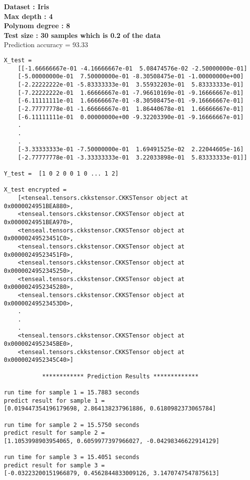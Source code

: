 \documentclass[11pt]{article}
\begin{document}
\textbf{Dataset : Iris}\\
\textbf{Max depth : 4}\\
\textbf{Polynom degree : 8 }\\
\textbf{Test size : 30 samples which is 0.2 of the data}\\
\large {Prediction accuracy = 93.33}\\
\begin{lstlisting}
X_test =  
    [[-1.66666667e-01 -4.16666667e-01  5.08474576e-02 -2.50000000e-01]
    [-5.00000000e-01  7.50000000e-01 -8.30508475e-01 -1.00000000e+00]
    [-2.22222222e-01 -5.83333333e-01  3.55932203e-01  5.83333333e-01]
    [-7.22222222e-01  1.66666667e-01 -7.96610169e-01 -9.16666667e-01]
    [-6.11111111e-01  1.66666667e-01 -8.30508475e-01 -9.16666667e-01]
    [-2.77777778e-01 -1.66666667e-01  1.86440678e-01  1.66666667e-01]
    [-6.11111111e-01  0.00000000e+00 -9.32203390e-01 -9.16666667e-01]
    .
    .
    .
    [-3.33333333e-01 -7.50000000e-01  1.69491525e-02  2.22044605e-16]
    [-2.77777778e-01 -3.33333333e-01  3.22033898e-01  5.83333333e-01]]
 
Y_test =  [1 0 2 0 0 1 0 ... 1 2]

X_test encrypted = 
    [<tenseal.tensors.ckkstensor.CKKSTensor object at 0x0000024951BEA880>, 
    <tenseal.tensors.ckkstensor.CKKSTensor object at 0x0000024951BEA970>, 
    <tenseal.tensors.ckkstensor.CKKSTensor object at 0x00000249523451C0>, 
    <tenseal.tensors.ckkstensor.CKKSTensor object at 0x00000249523451F0>, 
    <tenseal.tensors.ckkstensor.CKKSTensor object at 0x0000024952345250>, 
    <tenseal.tensors.ckkstensor.CKKSTensor object at 0x0000024952345280>, 
    <tenseal.tensors.ckkstensor.CKKSTensor object at 0x00000249523453D0>,
    .
    .
    .
    <tenseal.tensors.ckkstensor.CKKSTensor object at 0x0000024952345BE0>, 
    <tenseal.tensors.ckkstensor.CKKSTensor object at 0x0000024952345C40>]
    
           ************ Prediction Results *************
           
run time for sample 1 = 15.7883 seconds
predict result for sample 1 =
[0.019447354196179698, 2.864138237961886, 0.6180982373065784]

run time for sample 2 = 15.5750 seconds
predict result for sample 2 =
[1.1053998903954065, 0.6059977397966027, -0.04298346622914129]

run time for sample 3 = 15.4051 seconds
predict result for sample 3 = 
[-0.03223200151966879, 0.4562844833009126, 3.1470747547875613]


\end{lstlisting}
\end{document}
